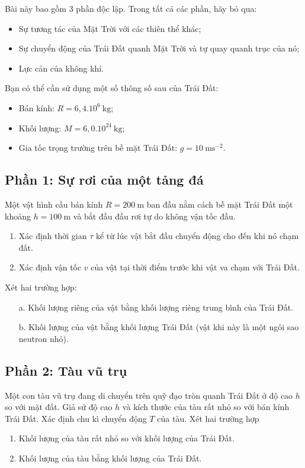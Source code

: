 \noindent Bài này bao gồm 3 phần độc lập. Trong tất cả các phần, hãy bỏ qua:
\begin{itemize}
  \item Sự tương tác của Mặt Trời với các thiên thể khác;
  \item Sự chuyển động của Trái Đất quanh Mặt Trời và tự quay quanh trục của nó;
  \item Lực cản của không khí.
\end{itemize}
Bạn có thể cần sử dụng một số thông số sau của Trái Đất:
\begin{itemize}
  \item Bán kính: $R=6,4.10^{6}\SI{}{\kilogram}$;
  \item Khối lượng: $M=6,0.10^{24}\SI{}{\kilogram}$;
  \item Gia tốc trọng trường trên bề mặt Trái Đất: $g=\SI{10}{\metre\second^{-2}}$.
\end{itemize}

\subsection*{Phần 1: Sự rơi của một tảng đá}


\noindent Một vật hình cầu bán kính $R=\SI{200}{\metre}$ ban đầu nằm cách bề mặt Trái Đất một khoảng $h=\SI{100}{\metre}$ và bắt đầu đầu rơi tự do không vận tốc đầu.

\begin{enumerate}
  \item Xác định thời gian $\tau$ kể từ lúc vật bắt đầu chuyển động cho đến khi nó chạm đất.
  \item Xác định vận tốc $v$ của vật tại thời điểm trước khi vật va chạm với Trái Đất.
\end{enumerate}
Xét hai trường hợp:
\begin{enumerate}
  \item[a.] Khối lượng riêng của vật bằng khối lượng riêng trung bình của Trái Đất.
  \item[b.] Khối lượng của vật bằng khối lượng Trái Đất (vật khi này là một ngôi sao neutron nhỏ).
\end{enumerate}

\subsection*{Phần 2: Tàu vũ trụ}
\noindent Một con tàu vũ trụ đang di chuyển trên quỹ đạo tròn quanh Trái Đất ở độ cao $h$ so với mặt đất. Giả sử độ cao $h$ và kích thước của tàu rất nhỏ so với bán kính Trái Đất. Xác định chu kì chuyển động $T$ của tàu. Xét hai trường hợp
\begin{enumerate}
  \item Khối lượng của tàu rất nhỏ so với khối lượng của Trái Đất.
  \item Khối lượng của tàu bằng khối lượng của Trái Đất.
\end{enumerate}

